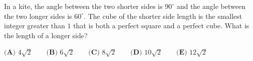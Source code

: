 In a kite, the angle between the two shorter sides is $90^\circ$ and the angle between the two longer sides is $60^\circ$. The cube of the shorter side length is the smallest integer greater than $1$ that is both a perfect square and a perfect cube. What is the length of a longer side?

$\textbf{(A) } 4\sqrt2 \qquad \textbf{(B) } 6\sqrt2 \qquad \textbf{(C) } 8\sqrt2 \qquad \textbf{(D) } 10\sqrt2 \qquad \textbf{(E) } 12\sqrt2$
